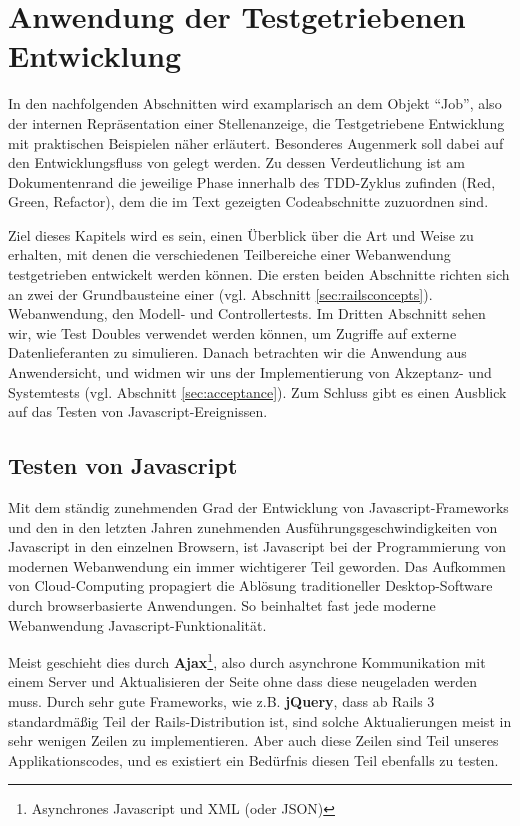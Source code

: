 \chapter{Anwendung der Testgetriebenen Entwicklung}
\label{sec:awtdd}

In den nachfolgenden Abschnitten wird examplarisch an dem Objekt "`Job"', also der internen Repräsentation einer Stellenanzeige, die Testgetriebene Entwicklung mit praktischen Beispielen näher erläutert.
Besonderes Augenmerk soll dabei auf den Entwicklungsfluss von  gelegt werden. Zu dessen Verdeutlichung ist am Dokumentenrand die jeweilige Phase innerhalb des TDD-Zyklus zufinden (Red, Green, Refactor), dem die im Text gezeigten Codeabschnitte zuzuordnen sind.

Ziel dieses Kapitels wird es sein, einen Überblick über die Art und Weise zu erhalten, mit denen die verschiedenen Teilbereiche einer Webanwendung testgetrieben entwickelt werden können.
Die ersten beiden Abschnitte richten sich an zwei der Grundbausteine einer  (vgl. Abschnitt \ref{sec:railsconcepts}).
Webanwendung, den Modell- und Controllertests. Im Dritten Abschnitt sehen wir, wie Test Doubles verwendet werden können, um Zugriffe auf externe Datenlieferanten zu simulieren. Danach betrachten wir die Anwendung aus Anwendersicht, und widmen wir uns der Implementierung von Akzeptanz- und Systemtests (vgl. Abschnitt \ref{sec:acceptance}). 
Zum Schluss gibt es einen Ausblick auf das Testen von Javascript-Ereignissen.






\section{Testen von Javascript}

Mit dem ständig zunehmenden Grad der Entwicklung von Javascript-Frameworks und den in den letzten Jahren zunehmenden Ausführungsgeschwindigkeiten von Javascript in den einzelnen Browsern, ist Javascript bei der Programmierung von modernen Webanwendung ein immer wichtigerer Teil geworden. Das Aufkommen von Cloud-Computing propagiert die Ablösung traditioneller Desktop-Software durch browserbasierte Anwendungen. So beinhaltet fast jede moderne Webanwendung Javascript-Funktionalität.

Meist geschieht dies durch \textbf{Ajax}\footnote{Asynchrones Javascript und XML (oder JSON)}, also durch asynchrone Kommunikation mit einem Server und Aktualisieren der Seite ohne dass diese neugeladen werden muss. Durch sehr gute Frameworks, wie z.B. \textbf{jQuery}, dass ab Rails 3 standardmäßig Teil der Rails-Distribution ist, sind solche Aktualierungen meist in sehr wenigen Zeilen zu implementieren. Aber auch diese Zeilen sind Teil unseres Applikationscodes, und es existiert ein Bedürfnis diesen Teil ebenfalls zu testen.

